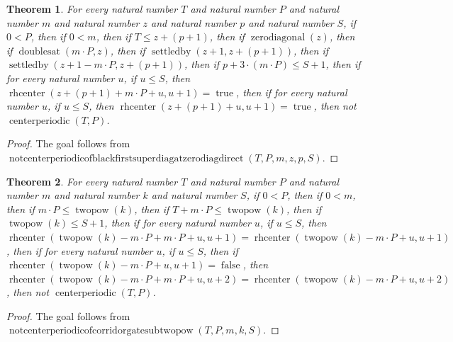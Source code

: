 \documentclass[11pt]{article}
\newtheorem{theorem}{Theorem}[section]
\theoremstyle{definition}
\begin{document}
\begin{theorem}
\label{ll:paper:not-centerperiodic-of-black-first-superdiag-at-zero-diag-direct}
For every natural number \(T\) and natural number \(P\) and natural number \(m\) and natural number \(z\) and natural number \(p\) and natural number \(S\), if \(0 < P\), then if \(0 < m\), then if \(T \le z + (p + 1)\), then if \(\operatorname{zerodiagonal}(z)\), then if \(\operatorname{doublesat}(m \cdot P, z)\), then if \(\operatorname{settledby}(z + 1, z + (p + 1))\), then if \(\operatorname{settledby}(z + 1 - m \cdot P, z + (p + 1))\), then if \(p + 3 \cdot (m \cdot P) \le S + 1\), then if for every natural number \(u\), if \(u \le S\), then \(\operatorname{rhcenter}(z + (p + 1) + m \cdot P + u, u + 1) = \operatorname{true}\), then if for every natural number \(u\), if \(u \le S\), then \(\operatorname{rhcenter}(z + (p + 1) + u, u + 1) = \operatorname{true}\), then not \(\operatorname{centerperiodic}(T, P)\).
\end{theorem}
\begin{proof}
The goal follows from \(\operatorname{notcenterperiodicofblackfirstsuperdiagatzerodiagdirect}(T, P, m, z, p, S)\).
\end{proof}
\begin{theorem}
\label{ll:paper:not-centerperiodic-of-corridor-gate-sub-twopow}
For every natural number \(T\) and natural number \(P\) and natural number \(m\) and natural number \(k\) and natural number \(S\), if \(0 < P\), then if \(0 < m\), then if \(m \cdot P \le \operatorname{twopow}(k)\), then if \(T + m \cdot P \le \operatorname{twopow}(k)\), then if \(\operatorname{twopow}(k) \le S + 1\), then if for every natural number \(u\), if \(u \le S\), then \(\operatorname{rhcenter}(\operatorname{twopow}(k) - m \cdot P + m \cdot P + u, u + 1) = \operatorname{rhcenter}(\operatorname{twopow}(k) - m \cdot P + u, u + 1)\), then if for every natural number \(u\), if \(u \le S\), then if \(\operatorname{rhcenter}(\operatorname{twopow}(k) - m \cdot P + u, u + 1) = \operatorname{false}\), then \(\operatorname{rhcenter}(\operatorname{twopow}(k) - m \cdot P + m \cdot P + u, u + 2) = \operatorname{rhcenter}(\operatorname{twopow}(k) - m \cdot P + u, u + 2)\), then not \(\operatorname{centerperiodic}(T, P)\).
\end{theorem}
\begin{proof}
The goal follows from \(\operatorname{notcenterperiodicofcorridorgatesubtwopow}(T, P, m, k, S)\).
\end{proof}
\end{document}
